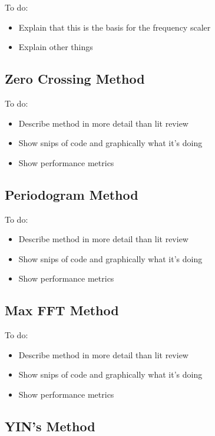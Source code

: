 \color{red}
To do:
\begin{itemize}
	\item Explain that this is the basis for the frequency scaler
	\item Explain other things
\end{itemize}
\color{black}

\subsection{Zero Crossing Method}

\color{red}
To do:
\begin{itemize}
	\item Describe method in more detail than lit review
	\item Show snips of code and graphically what it's doing
	\item Show performance metrics
\end{itemize}
\color{black}

\subsection{Periodogram Method}

\color{red}
To do:
\begin{itemize}
	\item Describe method in more detail than lit review
	\item Show snips of code and graphically what it's doing
	\item Show performance metrics
\end{itemize}
\color{black}

\subsection{Max FFT Method}

\color{red}
To do:
\begin{itemize}
	\item Describe method in more detail than lit review
	\item Show snips of code and graphically what it's doing
	\item Show performance metrics
\end{itemize}
\color{black}

\subsection{YIN's Method}


